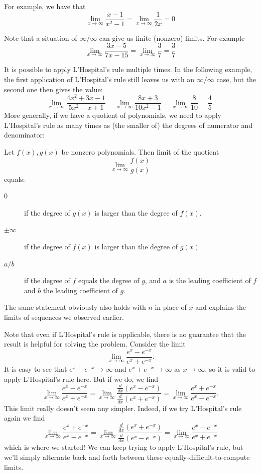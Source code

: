 For example, we have that
\[
\lim_{x\to\infty}\frac{x-1}{x^2-1}=
\lim_{x\to\infty}\frac{1}{2x}=0
\]

Note that a situation of $\infty/\infty$ can give us finite (nonzero)
limits. For example
\[
\lim_{x\to\infty}\frac{3x-5}{7x-15}=
\lim_{x\to\infty}\frac{3}{7}=\frac{3}{7}
\]

It is possible to apply L'Hospital's rule multiple times. In the following
example, the first application of L'Hospital's rule still leaves us with an
$\infty/\infty$ case, but the second one then gives the value:
\[
\lim_{x\to\infty}\frac{4x^2+3x-1}{5x^2-x+1}
=\lim_{x\to\infty}\frac{8x+3}{10x^2-1}
=\lim_{x\to\infty}\frac{8}{10}=\frac{4}{5}.
\]
More generally, if we have a quotient of polynomials, we need to apply 
L'Hospital's rule as many times as (the smaller of) the degrees of numerator
and denominator:
\begin{thm}
Let $f(x),g(x)$ be nonzero polynomials. Then limit of the quotient
\[
\lim_{x\to\infty}\frac{f(x)}{g(x)}
\]
equals:
\begin{description}
\item[$0$] if the degree of $g(x)$ is larger than the degree of $f(x)$.\\
\item[$\pm\infty$] if the degree of $f(x)$ is larger than the degree of
$g(x)$\\
\item[$a/b$] if the degree of $f$ equals the degree of $g$, and $a$ is the
leading coefficient of $f$ and $b$ the leading coefficient of $g$.
\end{description}
\end{thm}
The same statement obviously also holds with $n$ in place of $x$ and
explains the limits of sequences we observed earlier.

\begin{bsp}
Note that even if L'Hospital's rule is applicable, there is no guarantee that
the result is helpful for solving the problem.
Consider the limit
\[\lim_{x \to \infty}\frac{e^x-e^{-x}}{e^x+e^{-x}}.\]
It is easy to see that $e^x-e^{-x} \to \infty$ and $e^x+e^{-x} \to \infty$ as
$x \to \infty$, so it is valid to apply L'Hospital's rule here. But if we do,
we find
\[
\lim_{x \to \infty}\frac{e^x-e^{-x}}{e^x+e^{-x}} = \lim_{x \to
\infty}\frac{\frac{d}{dx}(e^x-e^{-x})}{\frac{d}{dx}(e^x+e^{-x})} = \lim_{x
\to \infty}\frac{e^x+e^{-x}}{e^x-e^{-x}}.
\]
This limit really doesn't seem
any simpler. Indeed, if we try L'Hospital's rule again we find
\[
\lim_{x \to
\infty}\frac{e^x+e^{-x}}{e^x-e^{-x}} = \lim_{x \to
\infty}\frac{\frac{d}{dx}(e^x+e^{-x})}{\frac{d}{dx}(e^x-e^{-x})} = \lim_{x
\to \infty}\frac{e^x-e^{-x}}{e^x+e^{-x}}
\]
which is where we started! We can
keep trying to apply L'Hospital's rule, but we'll simply alternate back and
forth between these equally-difficult-to-compute limits. 
\end{bsp}

